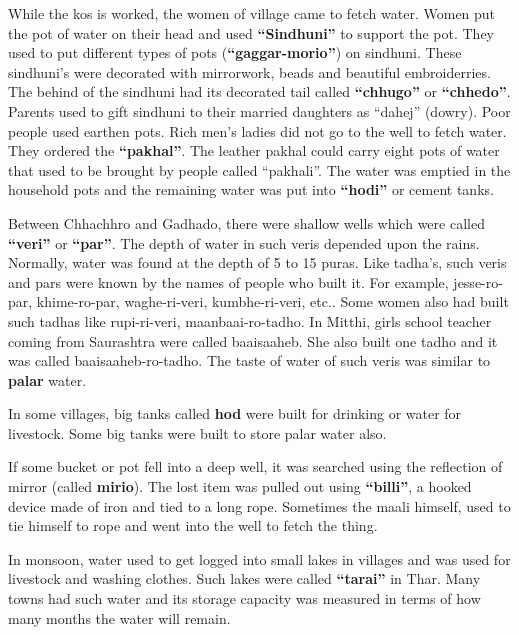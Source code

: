 While the kos is worked, the women of village came to fetch water. Women put the
pot of water on their head and used \textbf{``Sindhuni''} to support the pot.
They used to put different types of pots (\textbf{``gaggar-morio''}) on
sindhuni. These sindhuni's were decorated with mirrorwork, beads and beautiful
embroiderries. The behind of the sindhuni had its decorated tail called
\textbf{``chhugo''} or \textbf{``chhedo''}. Parents used to gift sindhuni to
their married daughters as ``dahej'' (dowry). Poor people used earthen pots.
Rich men's ladies did not go to the well to fetch water. They ordered the
\textbf{``pakhal''}. The leather pakhal could carry eight pots of water that
used to be brought by people called ``pakhali''. The water was emptied in the
household pots and the remaining water was put into \textbf{``hodi''} or cement
tanks.

Between Chhachhro and Gadhado, there were shallow wells which were called
\textbf{``veri''} or \textbf{``par''}. The depth of water in such veris depended
upon the rains. Normally, water was found at the depth of 5 to 15 puras. Like
tadha's, such veris and pars were known by the names of people who built it. For
example, jesse-ro-par, khime-ro-par, waghe-ri-veri, kumbhe-ri-veri, etc.. Some
women also had built such tadhas like rupi-ri-veri, maanbaai-ro-tadho. In
Mitthi, girls school teacher coming from Saurashtra were called baaisaaheb. She
also built one tadho and it was called baaisaaheb-ro-tadho. The taste of water
of such veris was similar to \textbf{palar} water.

In some villages, big tanks called \textbf{hod} were built for drinking or water
for livestock. Some big tanks were built to store palar water also.

If some bucket or pot fell into a deep well, it was searched using the
reflection of mirror (called \textbf{mirio}). The lost item was pulled out using
\textbf{``billi''}, a hooked device made of iron and tied to a long rope.
Sometimes the maali himself, used to tie himself to rope and went into the well
to fetch the thing.

In monsoon, water used to get logged into small lakes in villages and was used
for livestock and washing clothes. Such lakes were called \textbf{``tarai''} in
Thar. Many towns had such water and its storage capacity was measured in
terms of how many months the water will remain.

